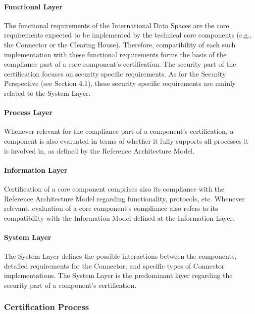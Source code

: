 \paragraph{Functional Layer\\}
The functional requirements of the International Data Spaces are the core requirements expected to be implemented by the technical core components (e.g., the Connector or the Clearing House). Therefore, compatibility of each such implementation with these functional requirements forms the basis of the compliance part of a core component’s certification. The security part of the certification focuses on security specific requirements. As for the Security Perspective (see Section 4.1), these security specific requirements are mainly related to the System Layer.

\paragraph{Process Layer\\}
Whenever relevant for the compliance part of a component’s certification, a component is also evaluated in terms of whether it fully supports all processes it is involved in, as defined by the Reference Architecture Model.

\paragraph{Information Layer\\}
Certification of a core component comprises also its compliance with the Reference Architecture Model regarding functionality, protocols, etc. Whenever relevant, evaluation of a core component’s compliance also refers to its compatibility with the Information Model defined at the Information Layer.

\paragraph{System Layer\\}
The System Layer defines the possible interactions between the components, detailed requirements for the Connector, and specific types of Connector implementations. The System Layer is the predominant layer regarding the security part of a component’s certification.



\subsubsection{Certification Process }

